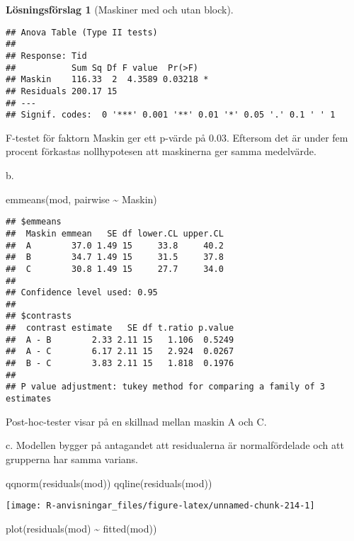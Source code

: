 \documentclass[
]{book}
\newenvironment{Shaded}{\begin{snugshade}}{\end{snugshade}}
\newcommand{\FunctionTok}[1]{\textcolor[rgb]{0.00,0.00,0.00}{#1}}
\newcommand{\NormalTok}[1]{#1}
\newcommand{\SpecialCharTok}[1]{\textcolor[rgb]{0.00,0.00,0.00}{#1}}
\theoremstyle{definition}
\theoremstyle{definition}
\theoremstyle{definition}
\theoremstyle{definition}
\newtheorem{hypothesis}{Lösningsförslag}[chapter]
\theoremstyle{remark}
\begin{document}
\begin{hypothesis}[Maskiner med och utan block]
\begin{verbatim}
## Anova Table (Type II tests)
## 
## Response: Tid
##           Sum Sq Df F value  Pr(>F)  
## Maskin    116.33  2  4.3589 0.03218 *
## Residuals 200.17 15                  
## ---
## Signif. codes:  0 '***' 0.001 '**' 0.01 '*' 0.05 '.' 0.1 ' ' 1
\end{verbatim}

F-testet för faktorn Maskin ger ett p-värde på 0.03. Eftersom det är under fem procent förkastas nollhypotesen att maskinerna ger samma medelvärde.

b.

\begin{Shaded}
\begin{Highlighting}[]
\FunctionTok{emmeans}\NormalTok{(mod, pairwise }\SpecialCharTok{\textasciitilde{}}\NormalTok{ Maskin)}
\end{Highlighting}
\end{Shaded}

\begin{verbatim}
## $emmeans
##  Maskin emmean   SE df lower.CL upper.CL
##  A        37.0 1.49 15     33.8     40.2
##  B        34.7 1.49 15     31.5     37.8
##  C        30.8 1.49 15     27.7     34.0
## 
## Confidence level used: 0.95 
## 
## $contrasts
##  contrast estimate   SE df t.ratio p.value
##  A - B        2.33 2.11 15   1.106  0.5249
##  A - C        6.17 2.11 15   2.924  0.0267
##  B - C        3.83 2.11 15   1.818  0.1976
## 
## P value adjustment: tukey method for comparing a family of 3 estimates
\end{verbatim}

Post-hoc-tester visar på en skillnad mellan maskin A och C.

c. Modellen bygger på antagandet att residualerna är normalfördelade och att grupperna har samma varians.

\begin{Shaded}
\begin{Highlighting}[]
\FunctionTok{qqnorm}\NormalTok{(}\FunctionTok{residuals}\NormalTok{(mod))}
\FunctionTok{qqline}\NormalTok{(}\FunctionTok{residuals}\NormalTok{(mod))}
\end{Highlighting}
\end{Shaded}

\begin{center}\texttt{[image: R-anvisningar\_files/figure-latex/unnamed-chunk-214-1]} \end{center}

\begin{Shaded}
\begin{Highlighting}[]
\FunctionTok{plot}\NormalTok{(}\FunctionTok{residuals}\NormalTok{(mod) }\SpecialCharTok{\textasciitilde{}} \FunctionTok{fitted}\NormalTok{(mod))}
\end{Highlighting}
\end{Shaded}


\end{hypothesis}
\end{document}
